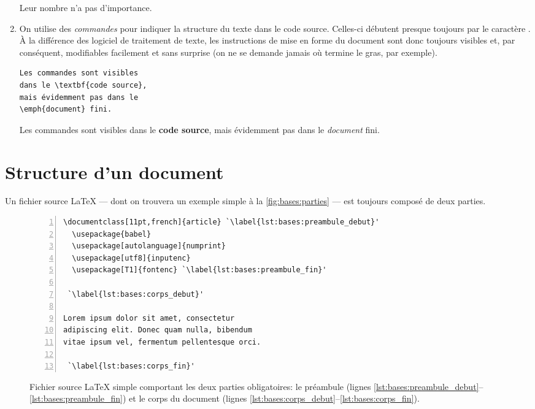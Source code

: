 \begin{enumerate}
\begin{demo}
\begin{texample}
        Leur nombre n'a pas
        d'importance.
    \end{texample}
  \end{demo}
%
\item On utilise des \emph{commandes} pour indiquer la structure du
  texte dans le code source. Celles-ci débutent presque toujours par
  le caractère {\bs}. À la différence des logiciel de traitement de
  texte, les instructions de mise en forme du document sont donc
  toujours visibles et, par conséquent, modifiables facilement et sans
  surprise (on ne se demande jamais où termine le gras, par exemple).
  \begin{demo}
    \begin{texample}
\begin{lstlisting}
Les commandes sont visibles
dans le \textbf{code source},
mais évidemment pas dans le
\emph{document} fini.
\end{lstlisting}
      \producing
      Les commandes sont visibles
      dans le \textbf{code source},
      mais évidemment pas dans le
      \emph{document} fini.
    \end{texample}
  \end{demo}
\end{enumerate}


\section{Structure d'un document}
\label{chap:bases:structure}

Un fichier source {\LaTeX} --- dont on trouvera un exemple simple à la
\autoref{fig:bases:parties} --- est toujours composé de deux parties.

\begin{figure}
  \centering
  \begin{minipage}{0.75\linewidth}
\begin{lstlisting}[numbers=left, numberstyle=\tiny]
\documentclass[11pt,french]{article} `\label{lst:bases:preambule_debut}'
  \usepackage{babel}
  \usepackage[autolanguage]{numprint}
  \usepackage[utf8]{inputenc}
  \usepackage[T1]{fontenc} `\label{lst:bases:preambule_fin}'

 `\label{lst:bases:corps_debut}'

Lorem ipsum dolor sit amet, consectetur
adipiscing elit. Donec quam nulla, bibendum
vitae ipsum vel, fermentum pellentesque orci.

 `\label{lst:bases:corps_fin}'
\end{lstlisting}
  \end{minipage}
  \caption{Fichier source {\LaTeX} simple comportant les deux parties
    obligatoires: le préambule (lignes
    \ref*{lst:bases:preambule_debut}--\ref*{lst:bases:preambule_fin})
    et le corps du document (lignes
    \ref*{lst:bases:corps_debut}--\ref*{lst:bases:corps_fin}).}
  \label{fig:bases:parties}
\end{figure}

